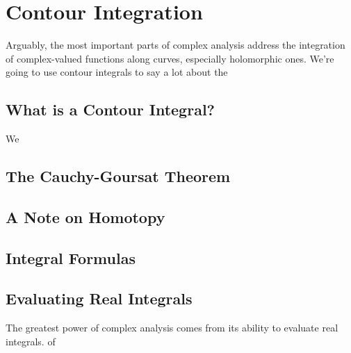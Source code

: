 \section{Contour Integration}

Arguably, the most important parts of complex analysis address the integration of complex-valued functions along curves, especially holomorphic ones. We're going to use contour integrals to say a lot about the

\subsection{What is a Contour Integral?}
We


\subsection{The Cauchy-Goursat Theorem}


\subsection{A Note on Homotopy}

\subsection{Integral Formulas}



\subsection{Evaluating Real Integrals}
The greatest power of complex analysis comes from its ability to evaluate real integrals.  of
